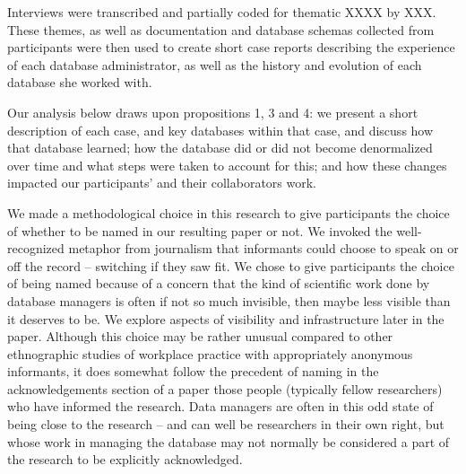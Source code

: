 Interviews were transcribed and partially coded for thematic XXXX by XXX. These themes, as well as documentation and database schemas collected from participants were then used to create short case reports describing the experience of each database administrator, as well as  the history and evolution of each database she worked with.  

Our analysis below draws upon propositions 1, 3 and 4: we present a short description of each case, and key databases within that case, and discuss how that database learned; how the database did or did not become denormalized over time and what steps were taken to account for this; and how these changes impacted our participants' and their collaborators work. 

We made a methodological choice in this research to give participants the choice of whether to be named in our resulting paper or not. We invoked the well-recognized metaphor from journalism that informants could choose to speak on or off the record – switching if they saw fit. We chose to give participants the choice of being named because of a concern that the kind of scientific work done by database managers is often if not so much invisible, then maybe less visible than it deserves to be. We explore aspects of visibility and infrastructure later in the paper. Although this choice may be rather unusual compared to other ethnographic studies of workplace practice with appropriately anonymous informants, it does somewhat follow the precedent of naming in the acknowledgements section of a paper those people (typically fellow researchers) who have informed the research. Data managers are often in this odd state of being close to the research – and can well be researchers in their own right, but whose work in managing the database may not normally be considered a part of the research to be explicitly acknowledged.
